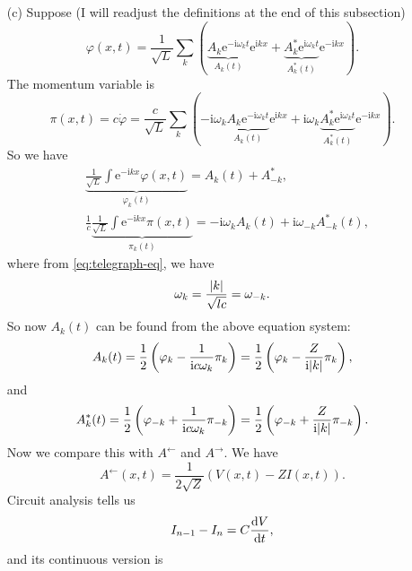 \documentclass[hyperref, a4paper]{article}
\newcommand*{\ii}{\mathrm{i}}
\newcommand*{\ee}{\mathrm{e}}
\begin{document}
\begin{itemize}
\item[(c)] Suppose (I will readjust the definitions at the end of this subsection)
\begin{equation}
    \varphi(x, t) = \frac{1}{\sqrt{L}} \sum_k 
    (\underbrace{A_k \ee^{- \ii \omega_k t}}_{A_k(t)} \ee^{\ii k x}
    + \underbrace{A_k^* \ee^{\ii \omega_k t}}_{A^*_k(t)} \ee^{- \ii k x}).
\end{equation}
The momentum variable is 
\begin{equation}
    \pi(x, t) = c \dot{\varphi} 
    = \frac{c}{\sqrt{L}} \sum_k 
    (- \ii \omega_k \underbrace{A_k \ee^{- \ii \omega_k t}}_{A_k(t)} \ee^{\ii k x}
    + \ii \omega_k \underbrace{A_k^* \ee^{\ii \omega_k t}}_{A^*_k(t)} \ee^{- \ii k x}).
\end{equation}
So we have 
\[
    \begin{aligned}
        &\underbrace{\frac{1}{\sqrt{L}} \int \ee^{- \ii k x} \varphi(x, t)}_{\varphi_k(t)}
        = A_k(t) + A^*_{-k} , \\
        &\frac{1}{c} \underbrace{\frac{1}{\sqrt{L}} \int \ee^{- \ii k x} \pi(x, t)}_{\pi_k(t)}
        = - \ii \omega_k A_k(t) + \ii \omega_{-k} A_{-k}^*(t),
    \end{aligned}
\] 
where from \eqref{eq:telegraph-eq}, we have 
\begin{equation}
    \omega_k = \frac{\abs{k}}{\sqrt{lc}} = \omega_{-k}.
\end{equation}
So now $A_k(t)$ can be found from the above equation system:
\begin{equation}
    A_k(t) = \frac{1}{2} \left( \varphi_k - \frac{1}{\ii c \omega_k} \pi_k \right)
    = \frac{1}{2} \left( \varphi_k - \frac{Z}{\ii \abs{k}} \pi_k \right),
\end{equation}
and 
\begin{equation}
    A_k^*(t) = \frac{1}{2} \left( \varphi_{-k} + \frac{1}{\ii c \omega_k} \pi_{-k} \right)
    = \frac{1}{2} \left( \varphi_{-k} + \frac{Z}{\ii \abs{k}} \pi_{-k} \right).
\end{equation}
Now we compare this with $A^\leftarrow$ and $A^\rightarrow$.
We have 
\begin{equation}
    A^\leftarrow(x, t) = \frac{1}{2 \sqrt{Z}} (V(x, t) - Z I(x, t)).
\end{equation}
Circuit analysis tells us
\begin{equation}
    I_{n-1} - I_n = C \dv{V}{t},
\end{equation}
and its continuous version is 
\begin{equation}

\end{equation}
\end{itemize}
\end{document}
